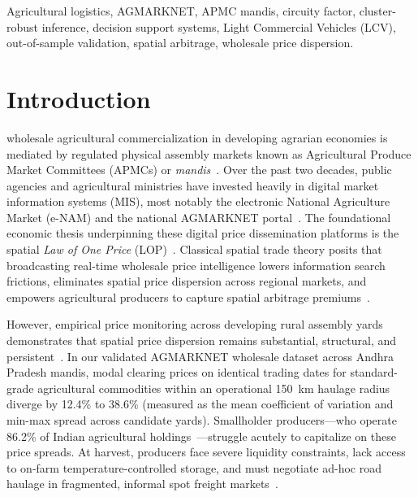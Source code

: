 \documentclass[journal]{IEEEtran}
\begin{document}
\begin{IEEEkeywords}
Agricultural logistics, AGMARKNET, APMC mandis, circuity factor, cluster-robust inference, decision support systems, Light Commercial Vehicles (LCV), out-of-sample validation, spatial arbitrage, wholesale price dispersion.
\end{IEEEkeywords}

\section{Introduction}
 wholesale agricultural commercialization in developing agrarian economies is mediated by regulated physical assembly markets known as Agricultural Produce Market Committees (APMCs) or \textit{mandis}~\cite{sekhar2021agricultural}. Over the past two decades, public agencies and agricultural ministries have invested heavily in digital market information systems (MIS), most notably the electronic National Agriculture Market (e-NAM) and the national AGMARKNET portal~\cite{sekhar2021agricultural, agmarknet2024}. The foundational economic thesis underpinning these digital price dissemination platforms is the spatial \textit{Law of One Price} (LOP)~\cite{takayama1971spatial, badiane1998spatial}. Classical spatial trade theory posits that broadcasting real-time wholesale price intelligence lowers information search frictions, eliminates spatial price dispersion across regional markets, and empowers agricultural producers to capture spatial arbitrage premiums~\cite{takayama1971spatial}.

However, empirical price monitoring across developing rural assembly yards demonstrates that spatial price dispersion remains substantial, structural, and persistent~\cite{mitra2018asymmetric, chatterjee2023market}. In our validated AGMARKNET wholesale dataset across Andhra Pradesh mandis, modal clearing prices on identical trading dates for standard-grade agricultural commodities within an operational 150~km haulage radius diverge by 12.4\% to 38.6\% (measured as the mean coefficient of variation and min-max spread across candidate yards). Smallholder producers---who operate 86.2\% of Indian agricultural holdings~\cite{agricensus2018}---struggle acutely to capitalize on these price spreads. At harvest, producers face severe liquidity constraints, lack access to on-farm temperature-controlled storage, and must negotiate ad-hoc road haulage in fragmented, informal spot freight markets~\cite{chatterjee2023market, casaburi2013rural}.
\end{document}
